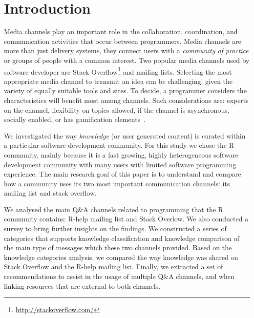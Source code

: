 \section{Introduction}
\label{cha:introduction}


    Media channels play an important role in the collaboration, coordination, and communication activities that occur between programmers.
    Media channels are more than just delivery systems, they connect users with a \textit{community of practice} or groups of people with a common interest.
    Two popular media channels used by software developer are Stack Overflow\footnote{\url{http://stackoverflow.com/}} and mailing lists.
    Selecting the most appropriate media channel to transmit an idea can be challenging, given the variety of equally suitable tools and sites.
    To decide, a programmer considers the characteristics will benefit most among channels.
    Such considerations are: experts on the channel, flexibility on topics allowed, if the channel is asynchronous, socially enabled, or has gamification elements~\cite{Vasilescu2014c}.

    We investigated the way \textit{knowledge} (or user generated content) is curated within a particular software development community.
    For this study we chose the R community, mainly because it is a fast growing, highly heterogeneous software development community with many users with
    limited software programming experience.
    The main research goal of this paper is to understand and compare how a community uses its two most important communication channels: its mailing list and
    stack overflow. 

    We analysed the main Q\&A channels related to programming that the R community contains: R-help mailing list and Stack Overlow.
    We also conducted a survey to bring further insights on the findings.
    We constructed a series of categories that supports knowledge classification and knowledge comparison of the main type of messages which these two channels provided.
    Based on the knowledge categories analysis, we compared the way knowledge was shared on Stack Overflow and the R-help mailing list.
    Finally, we extracted a set of recommendations to assist in the usage of multiple Q\&A channels, and when linking resources that are external to both channels.

